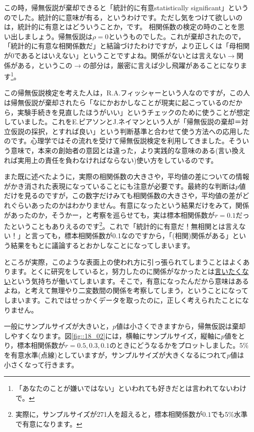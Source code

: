 \documentclass{ltjsbook}
\begin{document}
この時，帰無仮説が棄却できると「統計的に有意statistically significant」というのでした。統計的に意味が有る，というわけです。ただし気をつけて欲しいのは，統計的に有意とはどういうことか，です。
相関係数の検定の時のことを思い出しましょう。帰無仮説は$\rho=0$というものでした。これが棄却されたので，「統計的に有意な相関係数だ」と結論づけたわけですが，より正しくは「母相関が0であるとはいえない」ということですよね。関係がないとは言えない$\to$関係がある，というこの$\to$の部分は，厳密に言えば少し飛躍があることになります\footnote{「あなたのことが嫌いではない」といわれても好きだとは言われてないわけで。}。

この帰無仮説検定を考えた人は，R.A.フィッシャーという人なのですが，この人は帰無仮説が棄却されたら「なにかおかしなことが現実に起こっているのだから，実験手続きを見直したほうがいい」というチェックのために使うことが想定していました。これをE.ピアソンとJ.ネイマンという人が「帰無仮説の棄却＝対立仮説の採択，とすれば良い」という判断基準と合わせて使う方法への応用したのです。心理学ではその流れを受けて帰無仮説検定を利用してきました。そういう意味で，本来の創始者の意図とは違った，より実践的な意味のある(言い換えれば実用上の責任を負わなければならない)使い方をしているのです。

また既に述べたように，実際の相関係数の大きさや，平均値の差についての情報がかき消された表現になっていることにも注意が必要です。最終的な判断は$p$値だけを見るのですが，この数字だけみても相関係数の大きさや，平均値の差がどれぐらいあったのかはわかりません。有意になったという結果だけをみて，関係があったのか，そうかー，と考察を巡らせても，実は標本相関係数が$r=0.1$だったということもありえるのです\footnote{実際に，サンプルサイズが271人を超えると，標本相関係数が$0.1$でも5\%水準で有意になります。}。これで「統計的に有意だ！無相関とは言えない！」と言っても，標本相関係数が0.1なのですから，「(相関)関係がある」という結果をもとに議論するとおかしなことになってしまいます。

ところが実際，このような表面上の使われ方に引っ張られてしまうことはよくあります。とくに研究をしていると，努力したのに関係がなかったとは\underline{言いたくない}という気持ちが働いてしまいます。そこで，有意になったんだから意味はあるよね，と考えて無理やり二変数間の関係を考察してしまう，ということになってしまいます。これではせっかくデータを取ったのに，正しく考えられたことになりません。

一般にサンプルサイズが大きいと，$p$値は小さくできますから，帰無仮説は棄却しやすくなります。図\ref{fig::18_02}には，横軸にサンプルサイズ，縦軸に$p$値をとり，標本相関係数が$r=0.5,0.3,0.1$のときにどうなるかをプロットしました。5\%を有意水準(点線)としていますが，サンプルサイズが大きくなるにつれて$p$値は小さくなって行きます。
\end{document}
